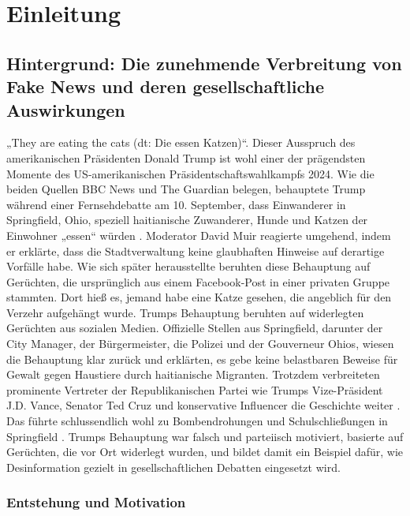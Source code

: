 \chapter{Einleitung}
\label{chap:einleitung}

\section{Hintergrund: Die zunehmende Verbreitung von Fake News und deren gesellschaftliche Auswirkungen}
\label{sec:hintergrund}


„They are eating the cats (dt: Die essen Katzen)“. Dieser Ausspruch des amerikanischen Präsidenten Donald Trump ist wohl einer der prägendsten Momente des 
US-amerikanischen Präsidentschaftswahlkampfs 2024. Wie die beiden Quellen BBC News und The Guardian belegen, behauptete Trump während einer Fernsehdebatte am 10. September, 
dass Einwanderer in Springfield, Ohio, speziell haitianische Zuwanderer, Hunde und Katzen der Einwohner „essen“ würden \cite{guardian2024_trump_springfield_pets, bbc2024_peteating_immigrants}. 
Moderator David Muir reagierte umgehend, indem er erklärte, dass die Stadtverwaltung keine glaubhaften Hinweise auf derartige Vorfälle habe. 
Wie sich später herausstellte beruhten diese Behauptung auf Gerüchten, die ursprünglich aus einem Facebook-Post in einer privaten Gruppe stammten. 
Dort hieß es, jemand habe eine Katze gesehen, die angeblich für den Verzehr aufgehängt wurde. Trumps Behauptung beruhten auf widerlegten Gerüchten aus sozialen Medien.
Offizielle Stellen aus Springfield, darunter der City Manager, der Bürgermeister, die Polizei und der Gouverneur Ohios, wiesen die Behauptung klar zurück und erklärten, 
es gebe keine belastbaren Beweise für Gewalt gegen Haustiere durch haitianische Migranten. Trotzdem verbreiteten prominente Vertreter der 
Republikanischen Partei wie Trumps Vize-Präsident J.D. Vance, Senator Ted Cruz und konservative Influencer die Geschichte weiter \cite{npr2024_vance_springfield_pets}. 
Das führte schlussendlich wohl zu Bombendrohungen und Schulschließungen in Springfield \cite{independent2024_springfield_bombthreats}. 
Trumps Behauptung war falsch und parteiisch motiviert, basierte auf Gerüchten, die vor Ort widerlegt wurden, und bildet damit ein Beispiel dafür, 
wie Desinformation gezielt in gesellschaftlichen Debatten eingesetzt wird.

\subsection{Entstehung und Motivation}

